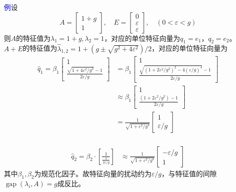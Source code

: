 \documentclass[notheorems,serif]{beamer}
\begin{document}
\begin{frame}

\textcolor{blue}{例}\quad 设$$
A=\left[\begin{array}{c}{1+g} \\ {1}\end{array}\right], \quad E=\left[\begin{array}{c}{0} \\ {\varepsilon} \\ {\varepsilon}\end{array}\right], \quad(0<\varepsilon<g)
$$
则$A$的特征值为$\lambda_{1}=1+g, \lambda_{2}=1$，对应的单位特征向量为$q_{1}=e_{1}，q_{2}=e_{2}$。$A+E$的特征值为$\hat{\lambda}_{1,2}=1+\left(g \pm \sqrt{g^{2}+4 \varepsilon^{2}}\right) / 2$，对应的单位特征向量为$$
\begin{aligned} \hat{q}_{1}
=\beta_{1} \left[\begin{array}{c}{1} \\ {\frac{\sqrt{1+4 \varepsilon^{2} / g^{2}}-1}{2 \varepsilon / g}}\end{array}\right]
&=\beta_{1} \left[\begin{array}{c}{1} \\ {\frac{\sqrt{\left(1+2 \varepsilon^{2} / g^{2}\right)^{2}-4(\varepsilon / g)^{4}}-1}{2 \varepsilon / g}}\end{array}\right] \\
& \approx \beta_{1} \left[\begin{array}{c}{1} \\ {\frac{\left(1+2 \varepsilon^{2} / g^{2}\right)-1}{2 \varepsilon / g}}\end{array}\right]\\
&=\frac{1}{\sqrt{1+\varepsilon^{2} / g^{2}}}\left[\begin{array}{c}{1} \\ {\varepsilon / g}\end{array}\right]\\
\end{aligned}$$
\end{frame}
\begin{frame}
$$\begin{aligned} 
\hat{q}_{2}=\beta_{2} \cdot\left[\frac{1}{\frac{1}{2 \varepsilon / g}}\right] &\approx \frac{1}{\sqrt{1+\varepsilon^{2} / g^{2}}}\left[\begin{array}{c}{-\varepsilon / g} \\ {1}\end{array}\right]\end{aligned}
$$
其中$\beta_1,\beta_2$为规范化因子。故特征向量的扰动约为$\varepsilon / g$，与特征值的间隙$\operatorname{gap}\left(\lambda_{i}, A\right)=g$成反比。
\end{frame}
\end{document}
